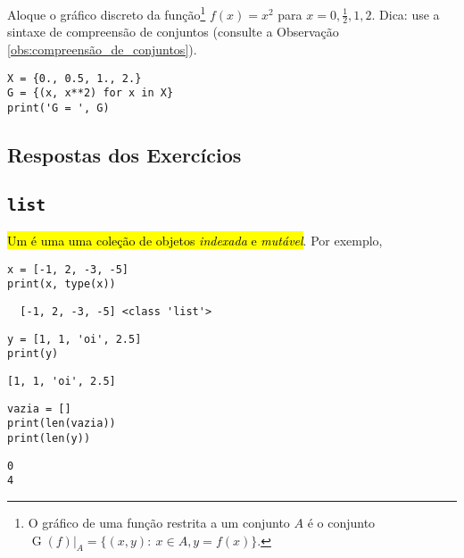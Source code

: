 \begin{exer}
  Aloque o gráfico discreto da função\footnote{O gráfico de uma função restrita a um conjunto $A$ é o conjunto $\operatorname{G}(f)|_{A} = \{(x,y):~x\in A, y=f(x)\}$.} $f(x) = x^2$ para $x=0, \frac{1}{2}, 1, 2$. Dica: use a sintaxe de compreensão de conjuntos (consulte a Observação \ref{obs:compreensão_de_conjuntos}).
\end{exer}

\begin{resp}

\begin{lstlisting}
X = {0., 0.5, 1., 2.}
G = {(x, x**2) for x in X}
print('G = ', G)
\end{lstlisting}

\end{resp}

\ifisbook 
\subsection*{Respostas dos Exercícios}
\shipoutAnswer
\fi


\subsection{\texttt{list}}

\hl{Um {\PYTHONlist} é uma uma coleção de objetos \emph{indexada} e \emph{mutável}}. Por exemplo,

\begin{lstlisting}
x = [-1, 2, -3, -5]
print(x, type(x))
\end{lstlisting}

\begin{verbatim}
  [-1, 2, -3, -5] <class 'list'>
\end{verbatim}

\begin{lstlisting}
y = [1, 1, 'oi', 2.5]
print(y)
\end{lstlisting}

\begin{verbatim}
[1, 1, 'oi', 2.5]
\end{verbatim}

\begin{lstlisting}
vazia = []
print(len(vazia))
print(len(y))
\end{lstlisting}

\begin{verbatim}
0
4
\end{verbatim}

